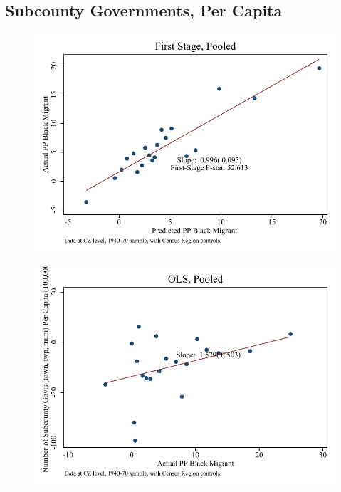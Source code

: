 \documentclass{article}
\begin{document}
\subsection{Subcounty Governments, Per Capita}

\clearpage
\begin{figure}
\centering
\includegraphics{figures/simplefigs/pooled_gen_subcounty_pc_C3_fs.pdf}
\end{figure}
\clearpage
\begin{figure}
\centering
\includegraphics{figures/simplefigs/pooled_gen_subcounty_pc_C3_ols.pdf}
\end{figure}
\clearpage
\end{document}
